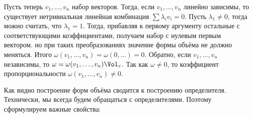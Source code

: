 Пусть теперь $v_1,\dots,v_n$ набор векторов. Тогда, если $v_1,\dots,v_n$ линейно зависимы, то существует нетривиальная линейная комбинация $\sum \lambda_i v_i=0$. Пусть $\lambda_1\neq 0$, тогда можно считать, что $\lambda_1=1$. Тогда, прибавляя к первому аргументу остальные с соответствующими коэффициентами, получаем набор с нулевым первым вектором. но при таких преобразованиях значение формы объёма не должно меняться. Итого $\omega(v_1,\dots,v_n)=\omega(0,\dots)=0$.
Обратно, если $v_1,\dots,v_n$ независимы, то $\omega=\omega(v_1,\dots,v_n)\Vol_v$. Так как $\omega \neq 0$, то коэффициент пропорциональности $\omega(v_1,\dots,v_n)\neq 0$.
\endproof
\ethrm


Как видно построение форм объёма сводится к построению определителя. Технически, мы всегда будем обращаться с определителями. Поэтому сформулируем важные свойства: 

